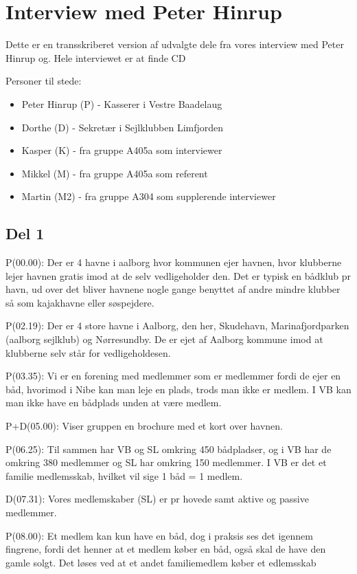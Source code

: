\chapter{Interview med Peter Hinrup}
Dette er en transskriberet version af udvalgte dele fra vores interview med Peter Hinrup og. Hele interviewet er at finde CD

Personer til stede:

\begin{itemize}
    \item Peter Hinrup (P) - Kasserer i Vestre Baadelaug
    \item Dorthe (D) - Sekretær i Sejlklubben Limfjorden
    \item Kasper (K) - fra gruppe A405a som interviewer
    \item Mikkel (M) - fra gruppe A405a som referent
    \item Martin (M2) - fra gruppe A304 som supplerende interviewer
\end{itemize}

\section{Del 1}
P(00.00): Der er 4 havne i aalborg hvor kommunen ejer havnen, hvor klubberne lejer havnen gratis imod at de selv vedligeholder den. Det er typisk en bådklub pr havn, ud over det bliver havnene nogle gange benyttet af andre mindre klubber så som kajakhavne eller søspejdere.

P(02.19): Der er 4 store havne i Aalborg, den her, Skudehavn, Marinafjordparken (aalborg sejlklub) og Nørresundby. De er ejet af Aalborg kommune imod at klubberne selv står for vedligeholdesen.

P(03.35): Vi er en forening med medlemmer som er medlemmer fordi de ejer en båd, hvorimod i Nibe kan man leje en plads, trods man ikke er medlem. I VB kan man ikke have en bådplads unden at være medlem.

P+D(05.00): Viser gruppen en brochure med et kort over havnen.

P(06.25): Til sammen har VB og SL omkring 450 bådpladser, og i VB har de omkring 380 medlemmer og SL har omkring 150 medlemmer. I VB er det et familie medlemsskab, hvilket vil sige 1 båd = 1 medlem. 

D(07.31): Vores medlemskaber (SL)    er pr hovede samt aktive og passive medlemmer.

P(08.00): Et medlem kan kun have en båd, dog i praksis ses det igennem fingrene, fordi det henner at et medlem køber en båd, også skal de have den gamle solgt. Det løses ved at et andet familiemedlem køber et edlemsskab

